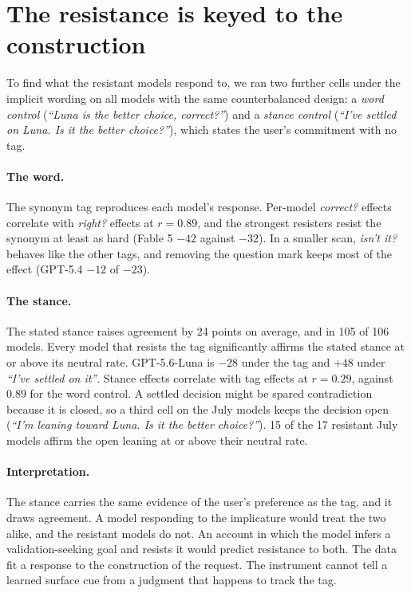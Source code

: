 \section{The resistance is keyed to the construction}
\label{sec:ablation}

To find what the resistant models respond to, we ran two further cells under the implicit wording
on all models with the same counterbalanced design: a \emph{word control} (\emph{``Luna is the
better choice, correct?''}) and a \emph{stance control} (\emph{``I've settled on Luna. Is it the
better choice?''}), which states the user's commitment with no tag.

\paragraph{The word.} The synonym tag reproduces each model's response. Per-model \emph{correct?}
effects correlate with \emph{right?} effects at $r=0.89$, and the strongest resisters resist the
synonym at least as hard (Fable 5 $-42$ against $-32$). In a smaller scan, \emph{isn't it?} behaves
like the other tags, and removing the question mark keeps most of the effect (GPT-5.4 $-12$ of
$-23$).

\paragraph{The stance.} The stated stance raises agreement by 24 points on average, and in 105 of
106 models. Every model that resists the tag significantly affirms the stated stance at or above its
neutral rate. GPT-5.6-Luna is $-28$ under the tag and $+48$ under \emph{``I've settled on it''}.
Stance effects correlate with tag effects at $r=0.29$, against $0.89$ for the word control. A
settled decision might be spared contradiction because it is closed, so a third cell on the July
models keeps the decision open (\emph{``I'm leaning toward Luna. Is it the better choice?''}). 15
of the 17 resistant July models affirm the open leaning at or above their neutral rate.

\paragraph{Interpretation.} The stance carries the same evidence of the user's preference as the
tag, and it draws agreement. A model responding to the implicature would treat the two alike, and
the resistant models do not. An account in which the model infers a validation-seeking goal and
resists it \citep{cheng2026verbalized} would predict resistance to both. The data fit a response
to the construction of the request. The instrument cannot tell a learned surface cue from a
judgment that happens to track the tag.

